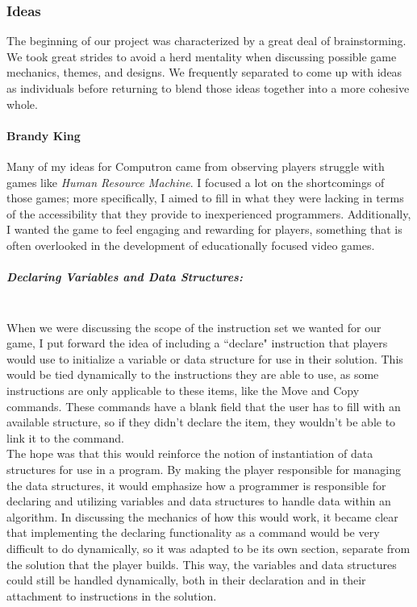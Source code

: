 \subsubsection{Ideas}
The beginning of our project was characterized by a great deal of brainstorming. We took great strides
to avoid a herd mentality when discussing possible game mechanics, themes, and designs. We frequently
separated to come up with ideas as individuals before returning to blend those ideas together into a more
cohesive whole.

\paragraph{Brandy King}
Many of my ideas for Computron came from observing players struggle with games like \textit{Human
Resource Machine}. I focused a lot on the shortcomings of those games; more specifically, I aimed to fill in
what they were lacking in terms of the accessibility that they provide to inexperienced programmers. 
Additionally, I wanted the game to feel engaging and rewarding for players, something that is often 
overlooked in the development of educationally focused video games. \\

\subparagraph{Declaring Variables and Data Structures:}\mbox{} \\
When we were discussing the scope of the instruction set we wanted for our game, I put forward the idea
of including a ``declare" instruction that players would use to initialize a variable or data structure for use
in their solution. This would be tied dynamically to the instructions they are able to use, as some instructions
are only applicable to these items, like the Move and Copy commands. These commands have a blank field
that the user has to fill with an available structure, so if they didn't declare the item, they wouldn't be able to
link it to the command.\\

The hope was that this would reinforce the notion of instantiation of data structures for use in a program. By
making the player responsible for managing the data structures, it would emphasize how a programmer
is responsible for declaring and utilizing variables and data structures to handle data within an algorithm. In
discussing the mechanics of how this would work, it became clear that implementing the declaring functionality
as a command would be very difficult to do dynamically, so it was adapted to be its own section, separate from
the solution that the player builds. This way, the variables and data structures could still be handled dynamically,
both in their declaration and in their attachment to instructions in the solution.\\

